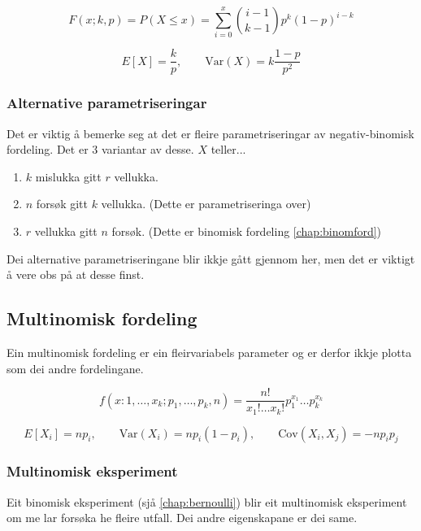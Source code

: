 \begin{equation}
    F(x; k, p) = P(X \leq x) = \sum_{i = 0}^{x} \binom{i - 1}{k - 1}p^k (1-p)^{i - k}
\end{equation}

\begin{equation}
    E[X] = \frac{k}{p}, \qquad \text{Var}(X) = k\frac{1-p}{p^2}
\end{equation}

\subsubsection{Alternative parametriseringar}
Det er viktig å bemerke seg at det er fleire parametriseringar av negativ-binomisk fordeling. \cite{wiki:negativebinom} Det er 3 variantar av desse. $X$ teller...

\begin{enumerate}
    \item $k$ mislukka gitt $r$ vellukka.
    \item $n$ forsøk gitt $k$ vellukka. (Dette er parametriseringa over)
    \item $r$ vellukka gitt $n$ forsøk. (Dette er binomisk fordeling \ref{chap:binomford})
\end{enumerate}

Dei alternative parametriseringane blir ikkje gått gjennom her, men det er viktigt å vere obs på at desse finst.

\subsection{Multinomisk fordeling}
Ein multinomisk fordeling er ein fleirvariabels parameter og er derfor ikkje plotta som dei andre fordelingane.

\begin{equation}
    f(x:1, \dots, x_k; p_1, \dots, p_k, n) = \frac{n!}{x_1! \dots x_k!}p_1^{x_1}\dots p_k^{x_k}
\end{equation}

\begin{equation}
    E[X_i] = np_i, \qquad \text{Var}(X_i) = np_i(1-p_i), \qquad \text{Cov}(X_i, X_j) = -np_ip_j
\end{equation}

\subsubsection{Multinomisk eksperiment}
Eit binomisk eksperiment (sjå \ref{chap:bernoulli}) blir eit multinomisk eksperiment om me lar forsøka he fleire utfall. Dei andre eigenskapane er dei same.


